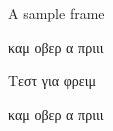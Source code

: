 \documentclass{beamer}
\newcommand{\testtext}{
 καμ οβερ α πριιι
 }
\begin{document}
 \begin{frame}{A sample frame}
  \testtext
 \end{frame}
 \setsansfont{Linux Biolinum O}
 \begin{frame}{Τεστ για φρειμ}
  \testtext
 \end{frame}
\end{document}
